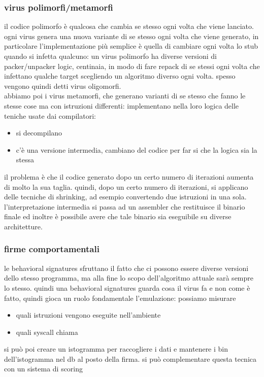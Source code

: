 \documentclass[12pt, oneside]{extbook} %
\begin{document}
\subsubsection{virus polimorfi/metamorfi}
il codice polimorfo è qualcosa che cambia se stesso ogni volta che viene lanciato. ogni virus genera una nuova variante di se stesso ogni volta che viene generato, in particolare l'implementazione più semplice è quella di cambiare ogni volta lo stub quando si infetta qualcuno: un virus polimorfo ha diverse versioni di packer/unpacker logic, centinaia, in modo di fare repack di se stessi ogni volta che infettano qualche target scegliendo un algoritmo diverso ogni volta. spesso vengono quindi detti virus oligomorfi.\\abbiamo poi i virus metamorfi, che generano varianti di se stesso che fanno le stesse cose ma con istruzioni differenti: implementano nella loro logica delle teniche usate dai compilatori:
\begin{itemize}
\item si decompilano
\item c'è una versione intermedia, cambiano del codice per far si che la logica sia la stessa
\end{itemize}
il problema è che il codice generato dopo un certo numero di iterazioni aumenta di molto la sua taglia. quindi, dopo un certo numero di iterazioni, si applicano delle tecniche di shrinking, ad esempio convertendo due istruzioni in una sola. l'interpretazione intermedia si passa ad un assembler che restituisce il binario finale ed inoltre è possibile avere che tale binario sia eseguibile su diverse architetture.

\subsubsection{firme comportamentali}
le behavioral signatures sfruttano il fatto che ci possono essere diverse versioni dello stesso programma, ma alla fine lo scopo dell'algoritmo attuale sarà sempre lo stesso. quindi una behavioral signatures guarda cosa il virus fa e non come è fatto, quindi gioca un ruolo fondamentale l'emulazione: possiamo misurare 
\begin{itemize}
\item quali istruzioni vengono eseguite nell'ambiente
\item quali syscall chiama
\end{itemize}
si può poi creare un istogramma per raccogliere i dati e mantenere i bin dell'istogramma nel db al posto della firma. si può complementare questa tecnica con un sistema di scoring
\end{document}
